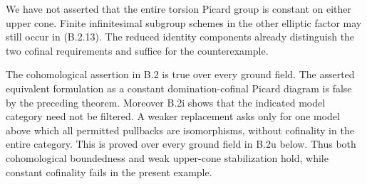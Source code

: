 \begin{remark}[Scope]
We have not asserted that the entire torsion Picard group is
constant on either upper cone.  Finite infinitesimal subgroup
schemes in the other elliptic factor may still occur in
(B.2.13).  The reduced identity components already distinguish
the two cofinal requirements and suffice for the counterexample.
\end{remark}


\begin{remark}
The cohomological assertion in B.2 is true over every ground field.
The asserted equivalent formulation as a constant domination-cofinal
Picard diagram is false by the preceding theorem.  Moreover B.2i shows
that the indicated model category need not be filtered.  A weaker
replacement asks only for one model above which all permitted pullbacks
are isomorphisms, without cofinality in the entire category.  This is
proved over every ground field in B.2u below.  Thus both
cohomological boundedness and weak upper-cone stabilization
hold, while constant cofinality fails in the present example.
\end{remark}


